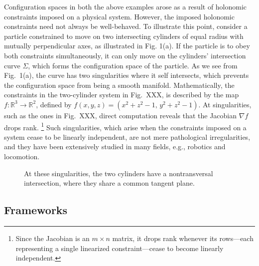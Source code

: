 Configuration spaces in both the above examples arose as a result of holonomic constraints imposed on a physical system.
However, the imposed holonomic constraints need not always be well-behaved.
To illustrate this point, consider a particle constrained to move on two intersecting cylinders of equal radius with mutually perpendicular axes, as illustrated in Fig. 1(a).
If the particle is to obey both constraints simultaneously, it can only move on the cylinders' intersection curve $\Sigma$, which forms the configuration space of the particle.
As we see from Fig.~1(a), the curve has two singularities where it self intersects, which prevents the configuration space from being a smooth manifold.
Mathematically, the constraints in the two-cylinder system in Fig.~XXX, is described by the map $f: \mathbb{R}^{3} \to \mathbb{R}^{2}$, defined by $f(x, y, z) = (x^{2} + z^{2} - 1,\, y^{2} + z^{2} - 1)$.
 At singularities, such as the ones in Fig.~XXX, direct computation reveals that the Jacobian $\nabla f$ drops rank.%
\footnote{Since the Jacobian is an $m\times n$ matrix, it drops rank whenever its rows---each representing a single linearized constraint---cease to become linearly independent.}
Such singularities, which arise when the constraints imposed on a system cease to be linearly independent, are not mere pathological irregularities, and they have been extensively studied in many fields, e.g., robotics and locomotion.

\begin{figure}
  \caption{
At these singularities, the two cylinders have a nontransversal intersection, where they share a common tangent plane.
  }
  \label{fig:cylcyl}
\end{figure}

\subsection{Frameworks}

